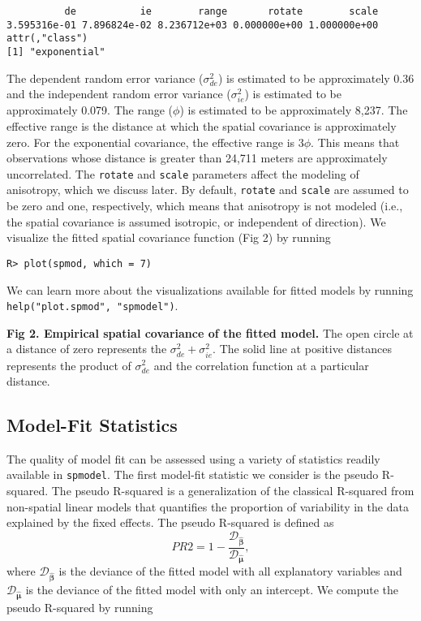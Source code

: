 \documentclass[10pt,letterpaper]{article}
\begin{document}
\begin{verbatim}
          de           ie        range       rotate        scale 
3.595316e-01 7.896824e-02 8.236712e+03 0.000000e+00 1.000000e+00 
attr(,"class")
[1] "exponential"
\end{verbatim}

The dependent random error variance (\(\sigma^2_{de}\)) is estimated to
be approximately 0.36 and the independent random error variance
(\(\sigma^2_{ie}\)) is estimated to be approximately 0.079. The range
(\(\phi\)) is estimated to be approximately 8,237. The effective range
is the distance at which the spatial covariance is approximately zero.
For the exponential covariance, the effective range is \(3\phi\). This
means that observations whose distance is greater than 24,711 meters are
approximately uncorrelated. The \texttt{rotate} and \texttt{scale}
parameters affect the modeling of anisotropy, which we discuss later. By
default, \texttt{rotate} and \texttt{scale} are assumed to be zero and
one, respectively, which means that anisotropy is not modeled (i.e., the
spatial covariance is assumed isotropic, or independent of direction).
We visualize the fitted spatial covariance function (Fig 2) by running

\begin{verbatim}
R> plot(spmod, which = 7)
\end{verbatim}

We can learn more about the visualizations available for fitted models
by running \texttt{help("plot.spmod",\ "spmodel")}.

\textbf{Fig 2. Empirical spatial covariance of the fitted model.} The
open circle at a distance of zero represents the
\(\sigma^2_{de} + \sigma^2_{ie}\). The solid line at positive distances
represents the product of \(\sigma^2_{de}\) and the correlation function
at a particular distance.

\hypertarget{model-fit-statistics}{%
\subsection{Model-Fit Statistics}\label{model-fit-statistics}}

The quality of model fit can be assessed using a variety of statistics
readily available in \texttt{spmodel}. The first model-fit statistic we
consider is the pseudo R-squared. The pseudo R-squared is a
generalization of the classical R-squared from non-spatial linear models
that quantifies the proportion of variability in the data explained by
the fixed effects. The pseudo R-squared is defined as \begin{equation*}
PR2 = 1 - \frac{\mathcal{D}_{\boldsymbol{\hat{\beta}}}}{\mathcal{D}_{\boldsymbol{\hat{\mu}}}},
\end{equation*} where \(\mathcal{D}_{\boldsymbol{\hat{\beta}}}\) is the
deviance of the fitted model with all explanatory variables and
\(\mathcal{D}_{\boldsymbol{\hat{\mu}}}\) is the deviance of the fitted
model with only an intercept. We compute the pseudo R-squared by running
\end{document}

